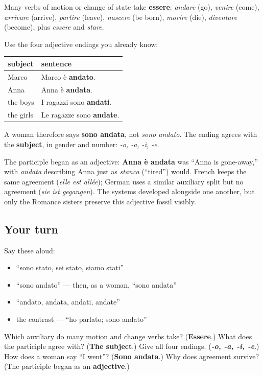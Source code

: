 \begin{grammarlens}[title={Grammar Lens: motion, change, and agreement}]
Many verbs of motion or change of state take \textbf{essere}: \emph{andare} (go), \emph{venire} (come), \emph{arrivare} (arrive), \emph{partire} (leave), \emph{nascere} (be born), \emph{morire} (die), \emph{diventare} (become), plus \emph{essere} and \emph{stare}.

Use the four adjective endings you already know:

\noindent
\begin{tabularx}{\linewidth}{@{}>{\raggedright\arraybackslash}X>{\raggedright\arraybackslash}X@{}}
\toprule
\textbf{subject} & \textbf{sentence} \\
\midrule
Marco & Marco è \textbf{andato}. \\
Anna & Anna è \textbf{andata}. \\
the boys & I ragazzi sono \textbf{andati}. \\
the girls & Le ragazze sono \textbf{andate}. \\
\bottomrule
\end{tabularx}

A woman therefore says \textbf{sono andata}, not \emph{sono andato}. The ending agrees with the \textbf{subject}, in gender and number: \emph{-o, -a, -i, -e}.
\end{grammarlens}

\begin{culture}
The participle began as an adjective: \textbf{Anna è andata} was “Anna is gone-away,” with \emph{andata} describing Anna just as \emph{stanca} (“tired”) would. French keeps the same agreement (\emph{elle est allée}); German uses a similar auxiliary split but no agreement (\emph{sie ist gegangen}). The systems developed alongside one another, but only the Romance sisters preserve this adjective fossil visibly.
\end{culture}

\subsection*{Your turn}
Say these aloud:

\begin{itemize}
\raggedright
  \item “sono stato, sei stato, siamo stati”
  \item “sono andato” — then, as a woman, “sono andata”
  \item “andato, andata, andati, andate”
  \item the contrast — “ho parlato; sono andato”
\end{itemize}

\begin{tcolorbox}[breakable,colback=teal!4,colframe=teal!35!black,title={Before you move on}]
Which auxiliary do many motion and change verbs take? (\textbf{Essere}.) What does the participle agree with? (\textbf{The subject}.) Give all four endings. (\emph{\textbf{-o, -a, -i, -e}}.) How does a woman say “I went”? (\textbf{Sono andata}.) Why does agreement survive? (The participle began as an \textbf{adjective}.)
\end{tcolorbox}
